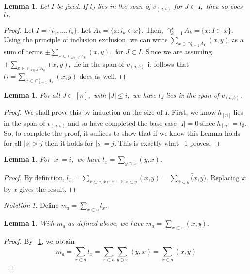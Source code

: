 \documentclass[10 pt]{amsart}
\theoremstyle{plain}
\newtheorem{lem}[thm]{Lemma}
\theoremstyle{definition}
\theoremstyle{remark}
\newtheorem{note}[thm]{Notation}
\numberwithin{equation}{section}
\begin{document}
\begin{lem}
\label{l_induction_step}
Let $I$ be fixed. If $l_J$ lies in the span of $v_{(a, b)}$ for $J \subset I,$ then so does $l_I.$

\end{lem}
\begin{proof}
Let $I = \{i_1,\ldots, i_s\}.$ Let $A_k = \{x \colon i_k \in x\}.$ Then, $\cap_{k=1}^s A_k = \{x \colon I \subset x\}.$ Using the principle of inclusion exclusion, we can write $\sum_{x \in\cap_{k=1}^s A_k} (x, y)$ as a sum of terms $\pm \sum_{x \in\cap_{k \in J} A_k} (x, y),$ for $J \subset I.$ Since we are assuming $\pm \sum_{x \in\cap_{k \in J} A_k} (x, y),$ lie in the span of $v_{(a, b)}$ it follows that $l_I = \sum_{x \in\cap_{k=1}^s A_k} (x, y)$ does as well.

\end{proof}

\begin{lem}
For all $J \subset [n],$ with $|J| \leq i,$ we have $l_{J}$ lies in the span of $v_{(a , b)}.$ 
\end{lem}
\begin{proof}
We shall prove this by induction on the size of $I.$ First, we know $h_{[n]}$ lies in the span of $v_{(a, b)}$ and so have completed the base case $|I| = 0$ since $h_{[n]} = l_{\emptyset}.$ So, to complete the proof, it suffices to show that if we know this Lemma holds for all $|s|>j$ then it holds for $|s| = j.$  This is exactly what ~\ref{l_induction_step} proves.
\end{proof}

\begin{lem}
\label{l_diag_equivalence}
For $|x| = i,$ we have $l_{x} = \sum_{y \supset x}^{}(y, x).$
\end{lem}
\begin{proof}
By definition, $l_{\bar x} = \sum_{\bar x\subset x,\bar x \cap x = \bar x,x\subset y}^{}(x, y) = \sum_{\bar x\subset y}^{}\bar (x, y).$ Replacing $\bar x$ by $x$ gives the result.
\end{proof}

\begin{note}
Define $m_a = \sum_{x \subset a}^{}l_{x}.$
\end{note}

\begin{lem}
\label{m_equivalence}
With $m_a$ as defined above, we have $m_a = \sum_{x\subset a}^{}(x, y).$
\end{lem}
\begin{proof}
By ~\ref{l_diag_equivalence}, we obtain
$$m_a = \sum_{x \subset a}^{}l_{x} = \sum_{x \subset a}^{}\sum_{y \supset x}^{}(y, x)= \sum_{x\subset a}^{}(x, y)$$
\end{proof}
\end{document}

